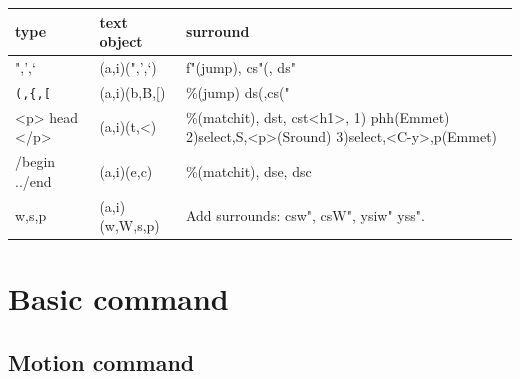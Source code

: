 \documentclass[a4paper,11pt,twoside]{book}
\begin{document}
\begin{tabular}{|p{}|p{}|p{}|}
\hline 
type & text object & surround \\

\hline 
",',`  & (a,i)(",',`) & f"(jump), cs"(, ds" \\

\hline 
\verb=(,{,[= & (a,i)(b,B,$[$) & \%(jump) ds(,cs("  \\

\hline 
<p> head </p> & (a,i)(t,<) & \%(matchit), dst, cst<h1>, 1) phh(Emmet) 2)select,S,<p>(Sround) 3)select,<C-y>,p(Emmet) \\

\hline
/begin ../end & (a,i)(e,c) & \%(matchit), dse, dsc \\

\hline 
w,s,p & (a,i)(w,W,s,p) & Add surrounds: csw", csW", ysiw" yss".  \\

\hline 
\end{tabular}

\section{Basic command}
\subsection{Motion command}
\end{document}
